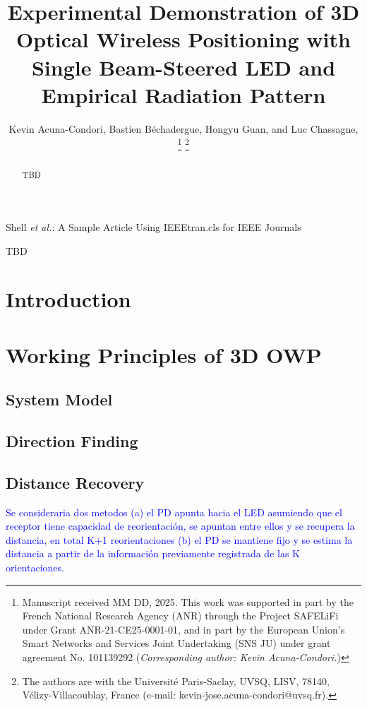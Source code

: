 \documentclass[journal]{IEEEtran}
\begin{document}

\title{Experimental Demonstration of 3D Optical Wireless Positioning with Single Beam-Steered LED and Empirical Radiation Pattern}
\author{
    Kevin Acuna-Condori,
    Bastien Béchadergue, 
    Hongyu Guan, and
    Luc Chassagne, 
    \thanks{Manuscript received MM DD, 2025.
    This work was supported in part by the French National Research Agency (ANR) through the Project SAFELiFi under Grant ANR-21-CE25-0001-01, and in part by the European Union's Smart Networks and Services Joint Undertaking (SNS JU) under grant agreement No. 101139292 (\textit{Corresponding author: Kevin Acuna-Condori.})
    }
    \thanks{The authors are with the Université Paris-Saclay, UVSQ, LISV, 78140, Vélizy-Villacoublay, France (e-mail: kevin-jose.acuna-condori@uvsq.fr).}
}
%
{Shell \MakeLowercase{\textit{et al.}}: A Sample Article Using IEEEtran.cls for IEEE Journals}
\maketitle

\begin{abstract}
TBD
\end{abstract}

\begin{IEEEkeywords} 
    TBD
\end{IEEEkeywords}

\section{Introduction}
\section{Working Principles of 3D OWP}
    \subsection{System Model}
    \subsection{Direction Finding}
    \subsection{Distance Recovery}
    \textcolor{blue}{Se consideraria dos metodos (a) el PD apunta hacia el LED asumiendo que el receptor tiene capacidad de reorientación, se apuntan entre ellos y se recupera la distancia, en total K+1 reorientaciones (b) el PD se mantiene fijo y se estima la distancia a partir de la información previamente registrada de las K orientaciones.}
\end{document}

